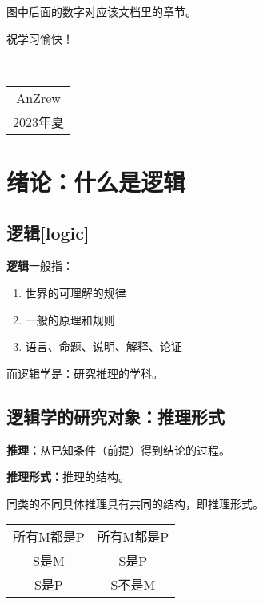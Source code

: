 \documentclass[12pt,onecolumn,a4paper]{book}
\numberwithin{table}{subsection}
\numberwithin{equation}{subsection}
\begin{document}
图中后面的数字对应该文档里的章节。

祝学习愉快！

~\\
\begin{flushright}
    \begin{tabular}{c}
        AnZrew\\
        2023年夏
    \end{tabular}
\end{flushright}



\newpage
{}
\setcounter{page}{1}
\tableofcontents
\newpage
\setcounter{page}{1}



\chapter{绪论：什么是逻辑}\label{chap1}

\section{逻辑[logic]}

\textbf{逻辑}一般指：

\begin{enumerate}[itemsep=0pt,parsep=0pt]
    \item 世界的可理解的规律
    \item 一般的原理和规则
    \item 语言、命题、说明、解释、论证
\end{enumerate}

而逻辑学是：研究推理的学科。

\section{逻辑学的研究对象：推理形式}

\textbf{推理：}从已知条件（前提）得到结论的过程。

\textbf{推理形式：}推理的结构。

同类的不同具体推理具有共同的结构，即推理形式。

\begin{table}
    \centering
    \begin{tabular}{c|c}
        所有M都是P & 所有M都是P \\
        S是M & S是P \\
        \hline
        S是P & S不是M \\
    \end{tabular}
\end{table}
\end{document}
